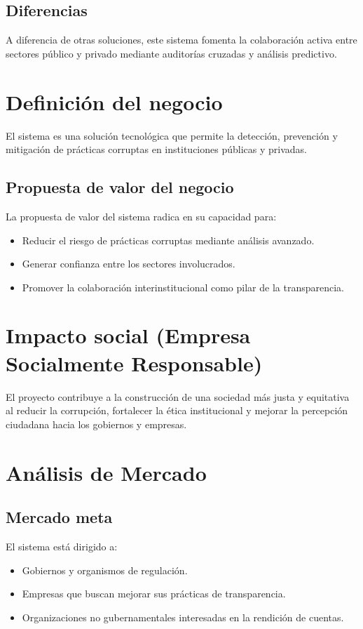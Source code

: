 \documentclass[a4paper,12pt]{article}
\begin{document}
\subsection{Diferencias}
A diferencia de otras soluciones, este sistema fomenta la colaboración activa entre sectores público y privado mediante auditorías cruzadas y análisis predictivo.

\section{Definición del negocio}
El sistema es una solución tecnológica que permite la detección, prevención y mitigación de prácticas corruptas en instituciones públicas y privadas.

\subsection{Propuesta de valor del negocio}
La propuesta de valor del sistema radica en su capacidad para:
\begin{itemize}
    \item Reducir el riesgo de prácticas corruptas mediante análisis avanzado.
    \item Generar confianza entre los sectores involucrados.
    \item Promover la colaboración interinstitucional como pilar de la transparencia.
\end{itemize}

\section{Impacto social (Empresa Socialmente Responsable)}
El proyecto contribuye a la construcción de una sociedad más justa y equitativa al reducir la corrupción, fortalecer la ética institucional y mejorar la percepción ciudadana hacia los gobiernos y empresas.

\section{Análisis de Mercado}
\subsection{Mercado meta}
El sistema está dirigido a:
\begin{itemize}
    \item Gobiernos y organismos de regulación.
    \item Empresas que buscan mejorar sus prácticas de transparencia.
    \item Organizaciones no gubernamentales interesadas en la rendición de cuentas.
\end{itemize}
\end{document}
